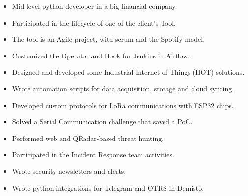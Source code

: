 
\begin{itemize}
  \item Mid level python developer in a big financial company.
  \item Participated in the lifecycle of one of the client's Tool.
  \item The tool is an Agile project, with scrum and the \faSpotify Spotify model.
  \item \faStar Customized the Operator and Hook for Jenkins in Airflow. 
\end{itemize}

\divider

\begin{itemize}
  \item Designed and developed some Industrial Internet of Things (IIOT) solutions.
  \item Wrote automation scripts for data acquisition, storage and cloud syncing.
  \item Developed custom protocols for LoRa communications with ESP32 chips.
  \item \faStar Solved a Serial Communication challenge that saved a PoC.
\end{itemize}

\divider

\begin{itemize}
  \item Performed web and QRadar-based threat hunting.
  \item Participated in the Incident Response team activities.
  \item Wrote security newsletters and alerts.
  \item \faStar Wrote python integrations for Telegram and OTRS in Demisto.
\end{itemize}

